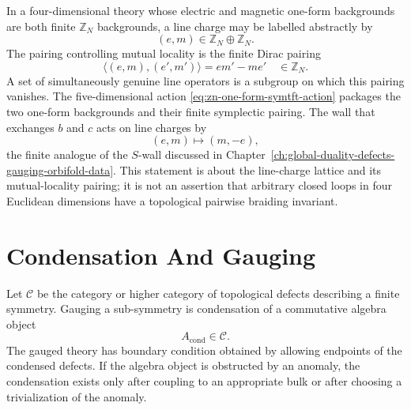 \begin{example}
\label{ex:zn-four-dimensional-line-data}
In a four-dimensional theory whose electric and magnetic one-form backgrounds
are both finite \(\mathbb Z_N\) backgrounds, a line charge may be labelled
abstractly by
\[
  (e,m)\in \mathbb Z_N\oplus\mathbb Z_N .
\]
The pairing controlling mutual locality is the finite Dirac pairing
\[
  \langle(e,m),(e',m')\rangle
  =
  em'-me'
  \quad\in\mathbb Z_N .
\]
A set of simultaneously genuine line operators is a subgroup on which this
pairing vanishes.  The five-dimensional action
\eqref{eq:zn-one-form-symtft-action} packages the two one-form backgrounds and
their finite symplectic pairing.  The wall that exchanges \(b\) and \(c\) acts
on line charges by
\[
  (e,m)\mapsto (m,-e),
\]
the finite analogue of the \(S\)-wall discussed in
Chapter~\ref{ch:global-duality-defects-gauging-orbifold-data}.  This statement
is about the line-charge lattice and its mutual-locality pairing; it is not an
assertion that arbitrary closed loops in four Euclidean dimensions have a
topological pairwise braiding invariant.
\end{example}

\section{Condensation And Gauging}

Let \(\mathcal C\) be the category or higher category of topological defects
describing a finite symmetry.  Gauging a sub-symmetry is condensation of a
commutative algebra object
\[
  A_{\mathrm{cond}}\in\mathcal C .
\]
The gauged theory has boundary condition obtained by allowing endpoints of
the condensed defects.  If the algebra object is obstructed by an anomaly,
the condensation exists only after coupling to an appropriate bulk or after
choosing a trivialization of the anomaly.

